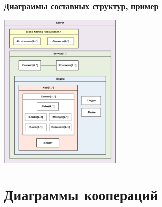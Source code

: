 \documentclass{../mcsslides}
\begin{document}
    \begin{frame}
        \frametitle{Диаграммы составных структур, пример}
        \begin{center}
            \includegraphics[width=0.45\textwidth]{compositeStructureExample.png}
        \end{center}
    \end{frame}

    \section{Диаграммы коопераций}
\end{document}
